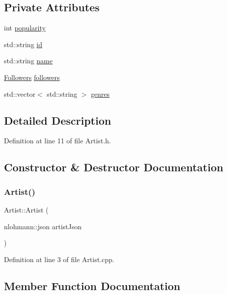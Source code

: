 \subsection*{Private Attributes}
\begin{DoxyCompactItemize}
\item 
int \mbox{\hyperlink{class_artist_acd7c260b4c2675900a34110b9129a425}{popularity}}
\item 
std\+::string \mbox{\hyperlink{class_artist_aa2320173c9ec00a99065fc8115af2fc5}{id}}
\item 
std\+::string \mbox{\hyperlink{class_artist_a41eed0ea0a3c2a0fb0b855c16bf2dbde}{name}}
\item 
\mbox{\hyperlink{class_followers}{Followers}} \mbox{\hyperlink{class_artist_a34417aa94c0323986e63915ac0e10925}{followers}}
\item 
std\+::vector$<$ std\+::string $>$ \mbox{\hyperlink{class_artist_a4e6b54e647382646bc57ecf449a22b48}{genres}}
\end{DoxyCompactItemize}


\subsection{Detailed Description}


Definition at line 11 of file Artist.\+h.



\subsection{Constructor \& Destructor Documentation}
\mbox{\label{class_artist_a054fa3b793609e0b63b1238f693a2ef2}} 
\subsubsection{\texorpdfstring{Artist()}{Artist()}}
{\footnotesize\ttfamily Artist\+::\+Artist (\begin{DoxyParamCaption}\item[{nlohmann\+::json}]{artist\+Json }\end{DoxyParamCaption})}



Definition at line 3 of file Artist.\+cpp.



\subsection{Member Function Documentation}
\mbox{\label{class_artist_aeebb53be1695123ed314d6637f03fdf3}} 
